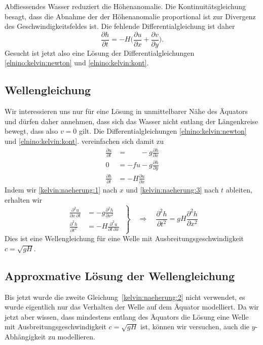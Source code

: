 Abfliessendes Wasser reduziert die Höhenanomalie.
Die Kontinuitätsgleichung
besagt, dass die Abnahme der der Höhenanomalie proportional ist zur
Divergenz des Geschwindigkeitsfeldes ist.
Die fehlende Differentialgleichung ist daher
\begin{equation}
\frac{\partial h}{\partial t}
=
-H\biggl(
\frac{\partial u}{\partial x} + \frac{\partial v}{\partial y}
\biggr).
\label{elnino:kelvin:kont}
\end{equation}
Gesucht ist jetzt also eine Lösung der Differentialgleichungen
\eqref{elnino:kelvin:newton} und \eqref{elnino:kelvin:kont}.

\subsection{Wellengleichung}
Wir interessieren uns nur für eine Lösung in unmittelbarer Nähe des
Äquators und dürfen daher annehmen, dass sich das Wasser nicht
entlang der Längenkreise bewegt, dass also $v=0$ gilt.
Die Differentialgleichungen
\eqref{elnino:kelvin:newton} und \eqref{elnino:kelvin:kont}.
vereinfachen sich damit zu
\begin{align}
\frac{\partial u}{\partial t}
&=
\phantom{-fu}
 - g\frac{\partial h}{\partial x}
\label{kelvin:naeherung:1}
\\
0
&=
-fu - g\frac{\partial h}{\partial y}
\label{kelvin:naeherung:2}
\\
\frac{\partial h}{\partial t}
&=
-H
\frac{\partial u}{\partial x}
\label{kelvin:naeherung:3}
\end{align}
Indem wir \eqref{kelvin:naeherung:1} nach $x$ und 
\eqref{kelvin:naeherung:3} nach $t$ ableiten, erhalten wir
\begin{equation}
\left.
\begin{aligned}
\frac{\partial^2 u}{\partial x\,\partial t}
&=
-g\frac{\partial^2h}{\partial x^2}
\\
\frac{\partial^2 h}{\partial t^2}
&=
-H\frac{\partial^2 u}{\partial t\,\partial x}
\end{aligned}
\;
\right\}
\quad
\Rightarrow
\quad
\frac{\partial^2 h}{\partial t^2}
=
gH\frac{\partial^2 h}{\partial x^2}
\label{kelvin:wellengleichung}
\end{equation}
Dies ist eine Wellengleichung für eine Welle mit Ausbreitungsgeschwindigkeit
$c=\sqrt{gH}$.

\subsection{Approxmative Lösung der Wellengleichung}
Bis jetzt wurde die zweite Gleichung~\eqref{kelvin:naeherung:2}
nicht verwendet, es wurde eigentlich nur das Verhalten der Welle auf
dem Äquator modelliert.
Da wir jetzt aber wissen, dass mindestens entlang des Äquators die Lösung
eine Welle mit Ausbreitungsgeschwindigkeit $c=\sqrt{gH}$ ist, können
wir versuchen, auch die $y$-Abhängigkeit zu modellieren.

